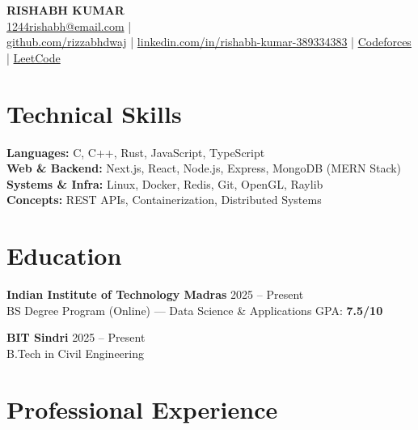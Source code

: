 \documentclass[a4paper,9pt]{article}
\begin{document}
\begin{center}
    {\Huge \textbf{RISHABH KUMAR}} \\[6pt]
    \small
    \href{mailto:1244rishabh@email.com}{1244rishabh@email.com}
    \quad| \\[3pt]

    \href{https://github.com/rizzabhdwaj}{github.com/rizzabhdwaj}
    \quad|\quad
    \href{https://linkedin.com/in/rishabh-kumar-389334383}{linkedin.com/in/rishabh-kumar-389334383}
    \quad|\quad
    \href{https://codeforces.com/profile/rizzabh1244}{Codeforces}
    \quad|\quad
    \href{https://leetcode.com/u/rishabh1244}{LeetCode}
\end{center}

\vspace{-5pt}

\section*{Technical Skills}

\textbf{Languages:} C, C++, Rust, JavaScript, TypeScript \\
\textbf{Web \& Backend:} Next.js, React, Node.js, Express, MongoDB (MERN Stack) \\
\textbf{Systems \& Infra:} Linux, Docker, Redis, Git, OpenGL, Raylib \\
\textbf{Concepts:} REST APIs, Containerization, Distributed Systems

\section*{Education}

\textbf{Indian Institute of Technology Madras} \hfill 2025 -- Present \\
BS Degree Program (Online) --- Data Science \& Applications \quad GPA: \textbf{7.5/10}
\vspace{1pt}

\textbf{BIT Sindri} \hfill 2025 -- Present \\
B.Tech in Civil Engineering

\section*{Professional Experience}
\end{document}
